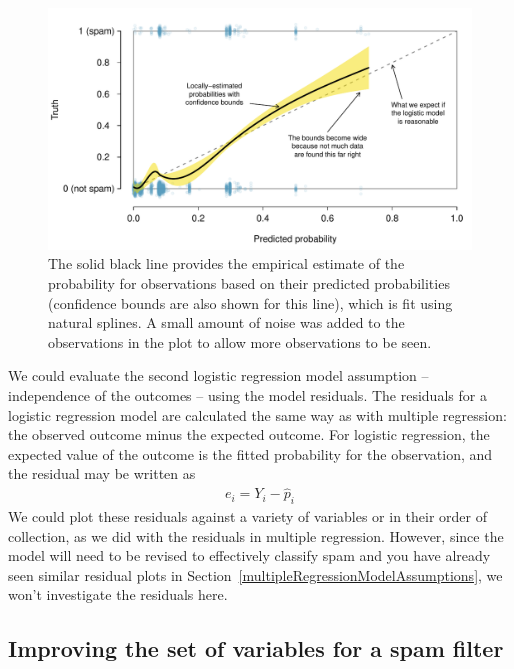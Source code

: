 \begin{figure}
\centering
\includegraphics[width=\textwidth]{ch_regr_mult_and_log/figures/logisticModel/logisticModelSpline}
\caption{The solid black line provides the empirical estimate of the probability for observations based on their predicted probabilities (confidence bounds are also shown for this line), which is fit using natural splines. A small amount of noise was added to the observations in the plot to allow more observations to be seen.}
\label{logisticModelSpline}
\end{figure}

We could evaluate the second logistic regression model assumption -- independence of the outcomes -- using the model residuals. The residuals for a logistic regression model are calculated the same way as with multiple regression: the observed outcome minus the expected outcome. For logistic regression, the expected value of the outcome is the fitted probability for the observation, and the residual may be written as
\begin{align*}
e_i = Y_i - \hat{p}_i
\end{align*}
We could plot these residuals against a variety of variables or in their order of collection, as we did with the residuals in multiple regression. However, since the model will need to be revised to effectively classify spam and you have already seen similar residual plots in Section~\ref{multipleRegressionModelAssumptions}, we won't investigate the residuals here.


\textC{\pagebreak}


\subsection{Improving the set of variables for a spam filter}
\label{improvingTheSetOfVariablesForASpamFilter}


